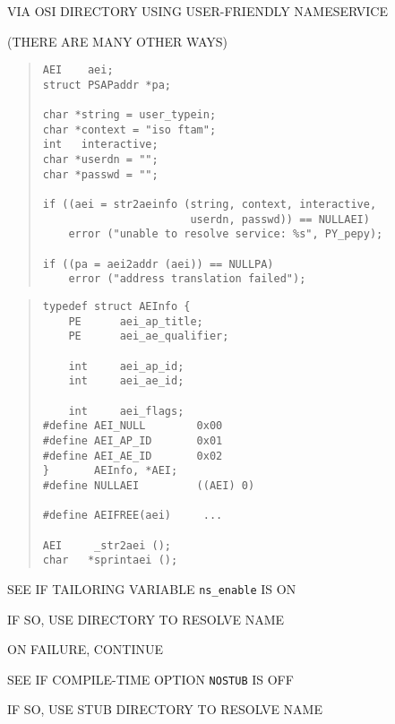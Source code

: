 \begin{bwslide}

\begin{nrtc}
\item	VIA OSI DIRECTORY USING USER-FRIENDLY NAMESERVICE
    \begin{nrtc}
    \item	(THERE ARE MANY OTHER WAYS)
    \end{nrtc}
\end{nrtc}
\begin{quote}\small\begin{verbatim}
AEI    aei;
struct PSAPaddr *pa;

char *string = user_typein;
char *context = "iso ftam";
int   interactive;
char *userdn = "";
char *passwd = "";

if ((aei = str2aeinfo (string, context, interactive,
                       userdn, passwd)) == NULLAEI)
    error ("unable to resolve service: %s", PY_pepy);

if ((pa = aei2addr (aei)) == NULLPA)
    error ("address translation failed");
\end{verbatim}\end{quote}
\end{bwslide}


\begin{bwslide}

\begin{quote}\small\begin{verbatim}
typedef struct AEInfo {
    PE      aei_ap_title;
    PE      aei_ae_qualifier;

    int     aei_ap_id;
    int     aei_ae_id;

    int     aei_flags;
#define AEI_NULL        0x00
#define AEI_AP_ID       0x01
#define AEI_AE_ID       0x02
}       AEInfo, *AEI;
#define NULLAEI         ((AEI) 0)

#define AEIFREE(aei)     ...

AEI     _str2aei ();
char   *sprintaei ();
\end{verbatim}\end{quote}
\end{bwslide}


\begin{bwslide}

\begin{nrtc}
\item	SEE IF TAILORING VARIABLE \verb"ns_enable" IS ON
    \begin{nrtc}
    \item	IF SO, USE DIRECTORY TO RESOLVE NAME
    \end{nrtc}
    ON FAILURE, CONTINUE

\item	SEE IF COMPILE-TIME OPTION \verb"NOSTUB" IS OFF
    \begin{nrtc}
    \item	IF SO, USE STUB DIRECTORY TO RESOLVE NAME
    \end{nrtc}
\end{nrtc}
\end{bwslide}


